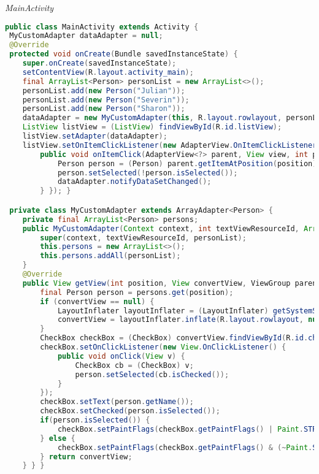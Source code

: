 \textit{MainActivity}
\begin{lstlisting}[language=java]
public class MainActivity extends Activity {
 MyCustomAdapter dataAdapter = null;
 @Override
 protected void onCreate(Bundle savedInstanceState) {
    super.onCreate(savedInstanceState);
    setContentView(R.layout.activity_main);
    final ArrayList<Person> personList = new ArrayList<>();
    personList.add(new Person("Julian"));
    personList.add(new Person("Severin"));
    personList.add(new Person("Sharon"));
    dataAdapter = new MyCustomAdapter(this, R.layout.rowlayout, personList);
    ListView listView = (ListView) findViewById(R.id.listView);
    listView.setAdapter(dataAdapter);
    listView.setOnItemClickListener(new AdapterView.OnItemClickListener() {
        public void onItemClick(AdapterView<?> parent, View view, int position, long id) {
            Person person = (Person) parent.getItemAtPosition(position);
            person.setSelected(!person.isSelected());
            dataAdapter.notifyDataSetChanged();
        } }); }

 private class MyCustomAdapter extends ArrayAdapter<Person> {
    private final ArrayList<Person> persons;
    public MyCustomAdapter(Context context, int textViewResourceId, ArrayList<Person> personList) {
        super(context, textViewResourceId, personList);
        this.persons = new ArrayList<>();
        this.persons.addAll(personList);
    }
    @Override
    public View getView(int position, View convertView, ViewGroup parent) {
        final Person person = persons.get(position);
        if (convertView == null) {
            LayoutInflater layoutInflater = (LayoutInflater) getSystemService(Context.LAYOUT_INFLATER_SERVICE);
            convertView = layoutInflater.inflate(R.layout.rowlayout, null);
        }
        CheckBox checkBox = (CheckBox) convertView.findViewById(R.id.checkbox);
        checkBox.setOnClickListener(new View.OnClickListener() {
            public void onClick(View v) {
                CheckBox cb = (CheckBox) v;
                person.setSelected(cb.isChecked());
            }
        });
        checkBox.setText(person.getName());
        checkBox.setChecked(person.isSelected());
        if(person.isSelected()) {
            checkBox.setPaintFlags(checkBox.getPaintFlags() | Paint.STRIKE_THRU_TEXT_FLAG);
        } else {
            checkBox.setPaintFlags(checkBox.getPaintFlags() & (~Paint.STRIKE_THRU_TEXT_FLAG));
        } return convertView;
    } } }
\end{lstlisting}

